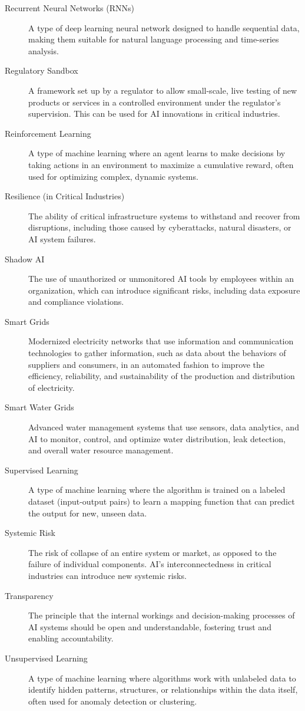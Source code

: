 \begin{description}
    \item[Recurrent Neural Networks (RNNs)] A type of deep learning neural network designed to handle sequential data, making them suitable for natural language processing and time-series analysis.
    \item[Regulatory Sandbox] A framework set up by a regulator to allow small-scale, live testing of new products or services in a controlled environment under the regulator's supervision. This can be used for AI innovations in critical industries.
    \item[Reinforcement Learning] A type of machine learning where an agent learns to make decisions by taking actions in an environment to maximize a cumulative reward, often used for optimizing complex, dynamic systems.
    \item[Resilience (in Critical Industries)] The ability of critical infrastructure systems to withstand and recover from disruptions, including those caused by cyberattacks, natural disasters, or AI system failures.
    \item[Shadow AI] The use of unauthorized or unmonitored AI tools by employees within an organization, which can introduce significant risks, including data exposure and compliance violations.
    \item[Smart Grids] Modernized electricity networks that use information and communication technologies to gather information, such as data about the behaviors of suppliers and consumers, in an automated fashion to improve the efficiency, reliability, and sustainability of the production and distribution of electricity.
    \item[Smart Water Grids] Advanced water management systems that use sensors, data analytics, and AI to monitor, control, and optimize water distribution, leak detection, and overall water resource management.
    \item[Supervised Learning] A type of machine learning where the algorithm is trained on a labeled dataset (input-output pairs) to learn a mapping function that can predict the output for new, unseen data.
    \item[Systemic Risk] The risk of collapse of an entire system or market, as opposed to the failure of individual components. AI's interconnectedness in critical industries can introduce new systemic risks.
    \item[Transparency] The principle that the internal workings and decision-making processes of AI systems should be open and understandable, fostering trust and enabling accountability.
    \item[Unsupervised Learning] A type of machine learning where algorithms work with unlabeled data to identify hidden patterns, structures, or relationships within the data itself, often used for anomaly detection or clustering.
\end{description}